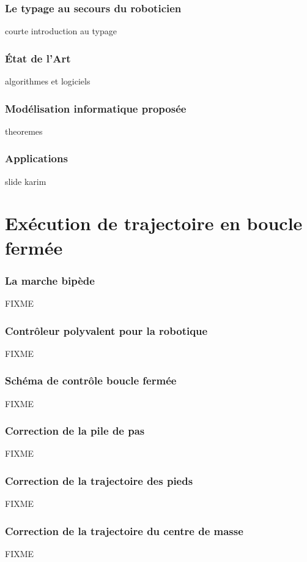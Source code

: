 \documentclass[14pt,utf8x,hyperref={pdfpagelabels=false}]{beamer}
\begin{document}
\begin{frame}
  \frametitle{Le typage au secours du roboticien}

  courte introduction au typage
\end{frame}

\begin{frame}
  \frametitle{État de l'Art}

  algorithmes et logiciels
\end{frame}

\begin{frame}
  \frametitle{Modélisation informatique proposée}

  theoremes
\end{frame}

\begin{frame}
  \frametitle{Applications}

  slide karim
\end{frame}


\section{Exécution de trajectoire en boucle fermée}

\begin{frame}
  \frametitle{La marche bipède}

  FIXME
\end{frame}

\begin{frame}
  \frametitle{Contrôleur polyvalent pour la robotique}

  FIXME
\end{frame}

\begin{frame}
  \frametitle{Schéma de contrôle boucle fermée}

  FIXME
\end{frame}

\begin{frame}
  \frametitle{Correction de la pile de pas}

  FIXME
\end{frame}

\begin{frame}
  \frametitle{Correction de la trajectoire des pieds}

  FIXME
\end{frame}

\begin{frame}
  \frametitle{Correction de la trajectoire du centre de masse}

  FIXME
\end{frame}
\end{document}

